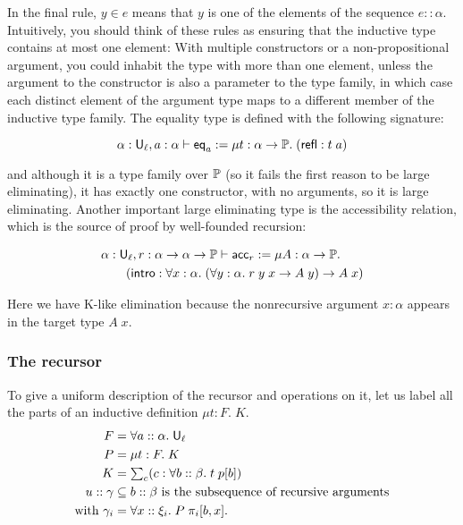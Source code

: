 In the final rule, $y\in e$ means that $y$ is one of the elements of the sequence $e::\alpha$. Intuitively, you should think of these rules as ensuring that the inductive type contains at most one element: With multiple constructors or a non-propositional argument, you could inhabit the type with more than one element, unless the argument to the constructor is also a parameter to the type family, in which case each distinct element of the argument type maps to a different member of the inductive type family. The equality type is defined with the following signature:

$$\alpha:\U_\ell,a:\alpha\vdash \mathsf{eq}_a:=\mu t:\alpha\to\P.\;(\mathsf{refl}:t\;a)$$

and although it is a type family over $\P$ (so it fails the first reason to be large eliminating), it has exactly one constructor, with no arguments, so it is large eliminating. Another important large eliminating type is the accessibility relation, which is the source of proof by well-founded recursion:

\begin{align*}
&\alpha:\U_\ell,r:\alpha\to\alpha\to\P\vdash\acc_r:=\mu A:\alpha\to\P.\\
&\qquad(\intro:\forall x:\alpha.\;(\forall y:\alpha.\;r\;y\;x\to A\;y)\to A\;x)
\end{align*}

Here we have K-like elimination because the nonrecursive argument $x:\alpha$ appears in the target type $A\;x$.

\subsubsection{The recursor}
To give a uniform description of the recursor and operations on it, let us label all the parts of an inductive definition $\mu t:F.\;K$.
\begin{align*}
F&=\forall a::\alpha.\;\U_\ell\\
P&=\mu t:F.\;K\\
K&=\textstyle{\sum_c(c:\forall b::\beta.\;t\;p[b])}\\
u::\gamma&\subseteq b::\beta\mbox{ is the subsequence of recursive arguments}\\
\mbox{with}\ \gamma_i&=\forall x::\xi_i.\;P\;\pi_i[b,x].
\end{align*}


